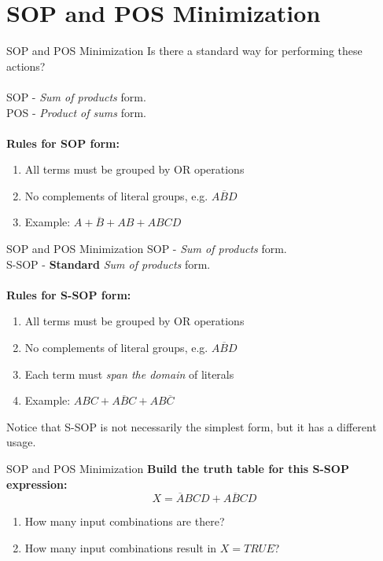 \documentclass{beamer}
\begin{document}
\section{SOP and POS Minimization}

\begin{frame}{SOP and POS Minimization}
Is there a standard way for performing these actions? \\ \hrulefill \\
\alert{SOP - \textit{Sum of products} form.} \\
\alert{POS} - \textit{Product of sums} form. \\ \hrulefill \\
\textbf{Rules for SOP form:}
\begin{enumerate}
\item All terms must be grouped by OR operations
\item No complements of literal groups, e.g. $\overline{ABD}$
\item Example: $A + \overline{B} + AB + ABCD$
\end{enumerate}
\end{frame}

\begin{frame}{SOP and POS Minimization}
\alert{SOP} - \textit{Sum of products} form. \\
\alert{S-SOP} - \textbf{Standard} \textit{Sum of products} form. \\ \hrulefill \\
\textbf{Rules for S-SOP form:}
\begin{enumerate}
\item All terms must be grouped by OR operations
\item No complements of literal groups, e.g. $\overline{ABD}$
\item Each term must \textit{span the domain} of literals
\item Example: $ABC + A\overline{B}C + AB\overline{C}$
\end{enumerate}
Notice that S-SOP is not necessarily the simplest form, but it has a different usage.
\end{frame}

\begin{frame}{SOP and POS Minimization}
\textbf{Build the truth table for this S-SOP expression:}
\begin{equation}
X = \overline{A}BCD+A\overline{B}CD
\end{equation}
\begin{enumerate}
\item How many input combinations are there?
\item How many input combinations result in $X = TRUE$?
\end{enumerate}
\end{frame}
\end{document}
